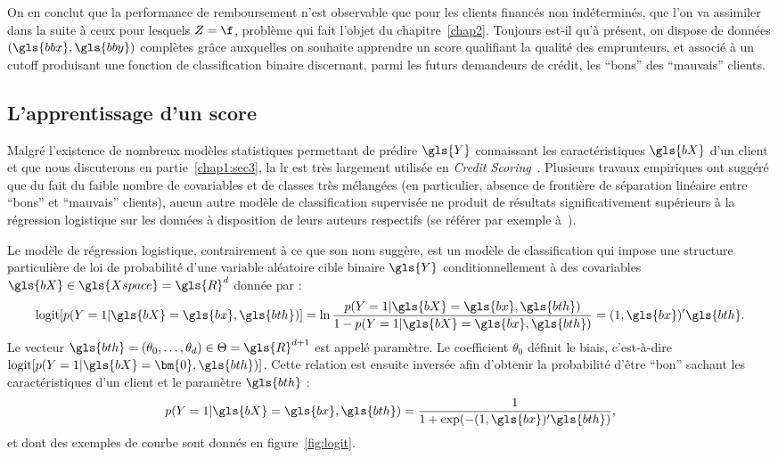 On en conclut que la performance de remboursement n'est observable que pour les clients financés non indéterminés, que l'on va assimiler dans la suite à ceux pour lesquels $Z=\f$, problème qui fait l'objet du chapitre~\ref{chap2}. Toujours est-il qu'à présent, on dispose de données $(\gls{bbx},\gls{bby})$ complètes grâce auxquelles on souhaite apprendre un \gls{score} qualifiant la qualité des emprunteurs, et associé à un cutoff produisant une fonction de classification binaire discernant, parmi les futurs demandeurs de crédit, les ``bons'' des ``mauvais'' clients.

\subsection{L'apprentissage d'un \gls{score}} \label{subsec:apprentissage}

Malgré l'existence de nombreux modèles statistiques permettant de prédire $\gls{Y}$ connaissant les caractéristiques $\gls{bX}$ d'un client et que nous discuterons en partie~\ref{chap1:sec3}, la \gls{lr} est très largement utilisée en \textit{Credit Scoring}~\cite{thomas2000survey}. Plusieurs travaux empiriques ont suggéré que du fait du faible nombre de covariables et de classes très mélangées (en particulier, absence de frontière de séparation linéaire entre ``bons'' et ``mauvais'' clients), aucun autre modèle de classification supervisée ne produit de résultats significativement supérieurs à la régression logistique sur les données à disposition de leurs auteurs respectifs (se référer par exemple à~\cite{hand1997statistical,baesens2003benchmarking,brown2012experimental}).

Le modèle de régression logistique, contrairement à ce que son nom suggère, est un modèle de classification qui impose une structure particulière de loi de probabilité d'une variable aléatoire cible binaire $\gls{Y}$ conditionnellement à des covariables $\gls{bX} \in \gls{Xspace}=\gls{R}^d$ donnée par :
\begin{equation} \label{eq:logit}
\text{logit}[p(Y=1 | \gls{bX}=\gls{bx}, \gls{bth})] = \ln \frac{p(Y=1 | \gls{bX}=\gls{bx}, \gls{bth})}{1-p(Y=1 | \gls{bX}=\gls{bx}, \gls{bth})} = (1,\gls{bx})' \gls{bth}.
\end{equation}
Le vecteur $\gls{bth} = (\theta_0,\dots,\theta_d) \in \Theta = \gls{R}^{d+1}$ est appelé paramètre. Le coefficient $\theta_0$ définit le biais, c'est-à-dire $\text{logit}[p(Y=1 | \gls{bX}=\bm{0}, \gls{bth})]$. Cette relation est ensuite inversée afin d'obtenir la probabilité d'être ``bon'' sachant les caractéristiques d'un client et le paramètre $\gls{bth}$ : $$p(Y=1 | \gls{bX}=\gls{bx}, \gls{bth}) = \frac{1}{1+\exp(-(1,\gls{bx})' \gls{bth})},$$ et dont des exemples de courbe sont donnés en figure~\ref{fig:logit}.

